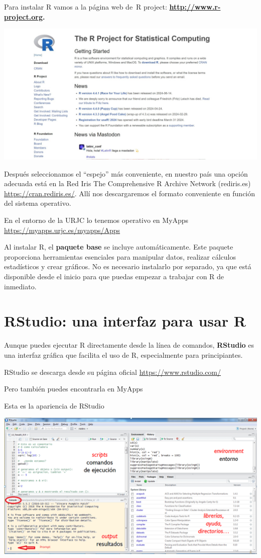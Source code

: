 \documentclass[
  letterpaper,
]{scrbook}
\begin{document}
Para instalar R vamos a la página web de~R project:
\href{http://www.r-project.org/}{\textbf{http://www.r-project.org}}\textbf{.}

\includegraphics{Prácticas_2025_26/Práctica_1/Imagenes/CRAN_2.jpeg}

Después seleccionamos el ``espejo'' más conveniente, en nuestro país una
opción adecuada está en la Red Iris The Comprehensive R Archive Network
(rediris.es) \url{https://cran.rediris.es/}. Allí nos descargaremos el
formato conveniente en función del sistema operativo.

En el entorno de la URJC lo tenemos operativo en MyApps
\url{https://myapps.urjc.es/myapps/Apps}

Al instalar R, el \textbf{paquete base} se incluye automáticamente. Este
paquete proporciona herramientas esenciales para manipular datos,
realizar cálculos estadísticos y crear gráficos. No es necesario
instalarlo por separado, ya que está disponible desde el inicio para que
puedas empezar a trabajar con R de inmediato.

\hypertarget{rstudio-una-interfaz-para-usar-r}{%
\section{RStudio: una interfaz para usar
R}\label{rstudio-una-interfaz-para-usar-r}}

Aunque puedes ejecutar R directamente desde la línea de comandos,
\textbf{RStudio} es una interfaz gráfica que facilita el uso de R,
especialmente para principiantes.

RStudio se descarga desde su página oficial
\url{https://www.rstudio.com/}

Pero también puedes encontrarla en MyApps

Esta es la apariencia de RStudio

\includegraphics{Prácticas_2025_26/Práctica_1/Imagenes/Rstudio_consola.png}
\end{document}

